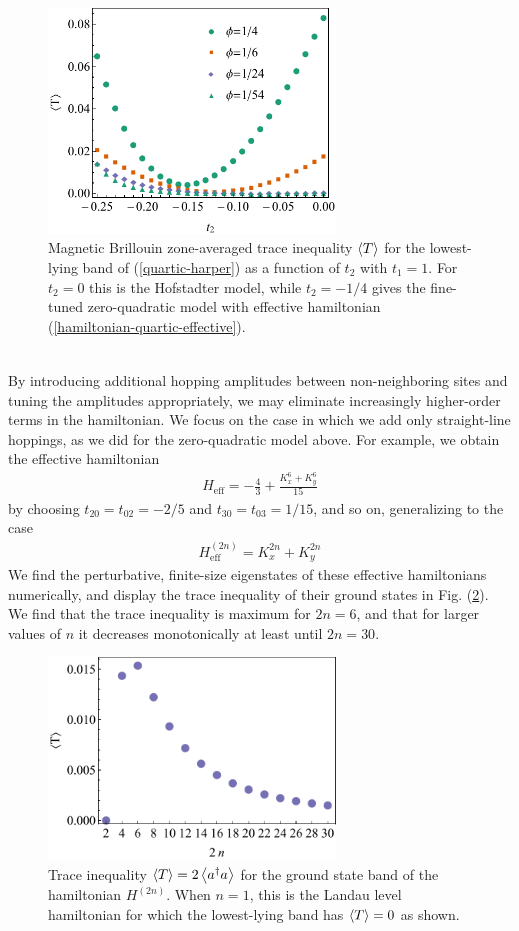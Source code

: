 \documentclass[aps,prb,twocolumn,letterpaper,twoside,nobalancelastpage,groupedaddress,amsmath,amssymb,floatfix,citeautoscript]{revtex4-1}
\begin{document}
\begin{figure}[thb]
\centering
\includegraphics[width=3.0in]{trace-delta-plot-new.pdf}
\caption{\label{trace-delta-plot}Magnetic Brillouin zone-averaged trace inequality $\expval{T}$ for the lowest-lying band of (\ref{quartic-harper}) as a function of $t_2$ with $t_1 = 1$. For $t_2 = 0$ this is the Hofstadter model, while $t_2 = -1/4$ gives the fine-tuned zero-quadratic model with effective hamiltonian (\ref{hamiltonian-quartic-effective}).}
\end{figure}
\begin{align*}
\end{align*}

By introducing additional hopping amplitudes between non-neighboring sites and tuning the amplitudes appropriately, we may eliminate increasingly higher-order terms in the hamiltonian. We focus on the case in which we add only straight-line hoppings, as we did for the zero-quadratic model above. For example, we obtain the effective hamiltonian
\begin{align*}
H_{\text{eff}} = -\frac{4}{3} + \frac{K_x^6 + K_y^6}{15}
\end{align*}
by choosing $t_{20}=t_{02}=-2/5$ and $t_{30}=t_{03}=1/15$, and so on, generalizing to the case
\begin{align}
H^{(2n)}_{\text{eff}} = K_x^{2n} + K_y^{2n}
\end{align}
We find the perturbative, finite-size eigenstates of these effective hamiltonians numerically, and display the trace inequality of their ground states in Fig. (\ref{plot-2n-trace}). We find that the trace inequality is maximum for $2n=6$, and that for larger values of $n$ it decreases monotonically at least until $2n=30$.
\begin{figure}[thb]
\centering
\includegraphics[width=3.0in]{tr-v-2n.pdf}
\caption{\label{plot-2n-trace}Trace inequality $\expval{T} = 2 \expval{a^{\dag} a}$ for the ground state band of the hamiltonian $H^{(2n)}$. Whe{}n $n=1$, this is the Landau level hamiltonian for which the lowest-lying band has $\expval{T}=0$ as shown.}
\end{figure}
\end{document}
